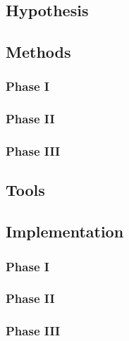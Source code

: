     \subsection{Hypothesis}
    \subsection{Methods}
        \subsubsection{Phase I}
        \subsubsection{Phase II}
        \subsubsection{Phase III}
    \subsection{Tools}
    \subsection{Implementation}
        \subsubsection{Phase I}
        \subsubsection{Phase II}
        \subsubsection{Phase III}
        

